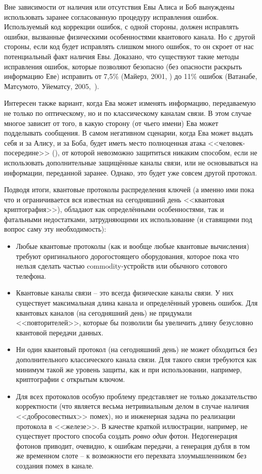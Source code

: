 Вне зависимости от наличия или отсутствия Евы Алиса и Боб вынуждены использовать заранее согласованную процедуру исправления ошибок. Используемый код коррекции ошибок, с одной стороны, должен исправлять ошибки, вызванные физическими особенностями квантового канала. Но с другой стороны, если код будет исправлять слишком много ошибок, то он скроет от нас потенциальный факт наличия Евы. Доказано, что существуют такие методы исправления ошибок, которые позволяют безопасно (без опасности раскрыть информацию Еве) исправить от 7,5\% (Майерз, 2001, \cite{Mayers:2001}) до 11\% ошибок (Ватанабе, Матсумото, Уйематсу, 2005,~\cite{Watanabe:Matsumoto:Uyematsu:2005}).

Интересен также вариант, когда Ева может изменять информацию, передаваемую не только по оптическому, но и по классическому каналам связи. В этом случае многое зависит от того, в какую сторону (от чьего имени) Ева может подделывать сообщения. В самом негативном сценарии, когда Ева может выдать себя и за Алису, и за Боба, будет иметь место полноценная атака <<человек-посередине>> (), от которой невозможно защититься никаким способом, если не использовать дополнительные защищённые каналы связи, или не основываться на информации, переданной заранее. Однако, это будет уже совсем другой протокол.

Подводя итоги, квантовые протоколы распределения ключей (а именно ими пока что и ограничивается вся известная на сегодняшний день <<квантовая криптография>>), обладают как определёнными особенностями, так и фатальными недостатками, затрудняющими их использование (и ставящими под вопрос саму эту необходимость):

\begin{itemize}
	\item Любые квантовые протоколы (как и вообще любые квантовые вычисления) требуют оригинального дорогостоящего оборудования, которое пока что нельзя сделать частью commodity-устройств или обычного сотового телефона.
	\item Квантовые каналы связи -- это всегда физические каналы связи. У них существует максимальная длина канала и определённый уровень ошибок. Для квантовых каналов (на сегодняшний день) не придумали <<повторителей>>, которые бы позволили бы увеличить длину безусловно квантовой передачи данных.
	\item Ни один квантовый протокол (на сегодняшний день) не может обходиться без дополнительного классического канала связи. Для такого связи требуются как минимум такой же уровень защиты, как и при использовании, например, криптографии с открытым ключом.
	\item Для всех протоколов особую проблему представляет не только доказательство корректности (что является весьма нетривиальным делом в случае наличия <<добросовестных>> помех), но и инженерная задача по реализации протокола в <<железе>>. В качестве краткой иллюстрации, например, не существует простого способа создать \emph{ровно один} фотон. Недогенерация фотонов приводит, очевидно, к ошибкам передачи, а генерация дубля в том же временном слоте -- к возможности его перехвата злоумышленником без создания помех в канале.
\end{itemize}


